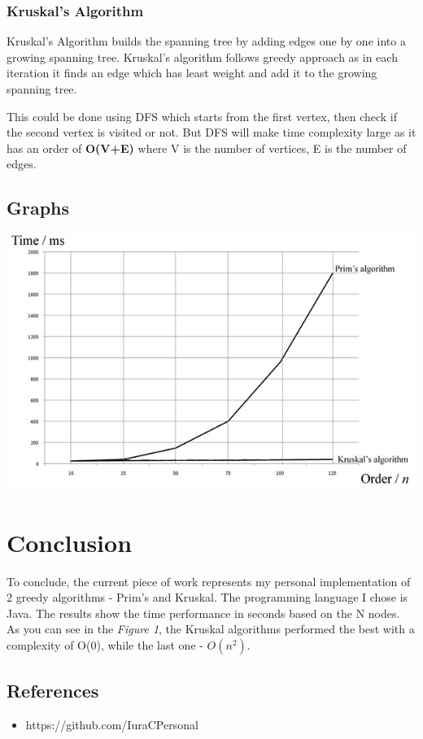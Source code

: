 \documentclass[a4paper, 12pt]{article}
\begin{document}
\subsubsection*{Kruskal's Algorithm}

Kruskal’s Algorithm builds the spanning tree by adding edges one by one into a growing spanning tree. Kruskal's algorithm follows greedy approach as in each iteration it finds an edge which has least weight and add it to the growing spanning tree.

This could be done using DFS which starts from the first vertex, then check if the second vertex is visited or not. But DFS will make time complexity large as it has an order of \textbf{O(V+E)} where V is the number of vertices, E is the number of edges.

\subsection{Graphs}

\includegraphics[width=14cm]{img1.png}

\section{Conclusion}

To conclude, the current piece of work represents my personal implementation of
2 greedy algorithms - Prim's and Kruskal. The programming language I chose is
Java. The results show the time performance in seconds based on the N nodes.
As you can see in the \textit{Figure 1}, the Kruskal algorithms performed the best with
a complexity of O(0), while the last one - $O(n^2)$.

\subsection{References}

\begin{itemize}
      \item https://github.com/IuraCPersonal
\end{itemize}
\end{document}
